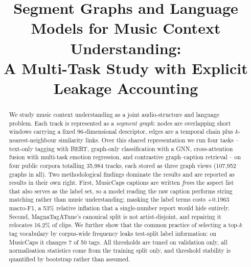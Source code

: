 \documentclass[conference]{IEEEtran}
\newcommand{\LeakGap}{$+$0.1963}
\newcommand{\LeakPct}{53}
\newcommand{\NGraphs}{107{,}952}
\newcommand{\NTracks}{35{,}984}
\begin{document}
\title{Segment Graphs and Language Models for Music Context Understanding:\\
A Multi-Task Study with Explicit Leakage Accounting}

\author{
  \and
  \and
}

\maketitle

\begin{abstract}
We study music context understanding as a joint audio-structure and language
problem. Each track is represented as a \emph{segment graph}: nodes are
overlapping short windows carrying a fixed 96-dimensional descriptor, edges are
a temporal chain plus $k$-nearest-neighbour similarity links. Over this shared
representation we run four tasks -- text-only tagging with BERT, graph-only
classification with a GNN, cross-attention fusion with multi-task emotion
regression, and contrastive graph--caption retrieval -- on four public corpora
totalling \NTracks{} tracks, each stored as three graph views
(\NGraphs{} graphs in all). Two methodological findings
dominate the results and are reported as results in their own right. First,
MusicCaps captions are written \emph{from} the aspect list that also serves as
the label set, so a model reading the raw caption performs string matching
rather than music understanding; masking the label terms costs
\LeakGap{} macro-F1, a \LeakPct{}\% relative inflation that a single-number
report would hide entirely. Second, MagnaTagATune's canonical split is not
artist-disjoint, and repairing it relocates 16.2\% of clips. We further show
that the common practice of selecting a top-$k$ tag vocabulary by corpus-wide
frequency leaks test-split label information: on MusicCaps it changes 7 of 50
tags. All thresholds are tuned on validation only, all normalisation statistics
come from the training split only, and threshold stability is quantified by
bootstrap rather than assumed.
\end{abstract}
\end{document}
